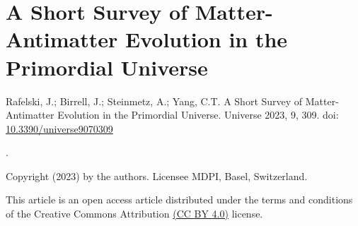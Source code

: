 \chapter{A Short Survey of Matter-Antimatter Evolution in the Primordial Universe}
\label{appendixD}
\begin{center}
Rafelski, J.; Birrell, J.; Steinmetz, A.; Yang, C.T. A Short Survey of Matter-Antimatter Evolution in the Primordial Universe. Universe 2023, 9, 309.
doi: \href{https://doi.org/10.3390/universe9070309}{10.3390/universe9070309}

.

Copyright (2023) by the authors. Licensee MDPI, Basel, Switzerland.

This article is an open access article distributed under the terms and conditions of the Creative Commons Attribution \href{https://creativecommons.org/licenses/by/4.0/}{(CC BY 4.0)} license.

\end{center}

